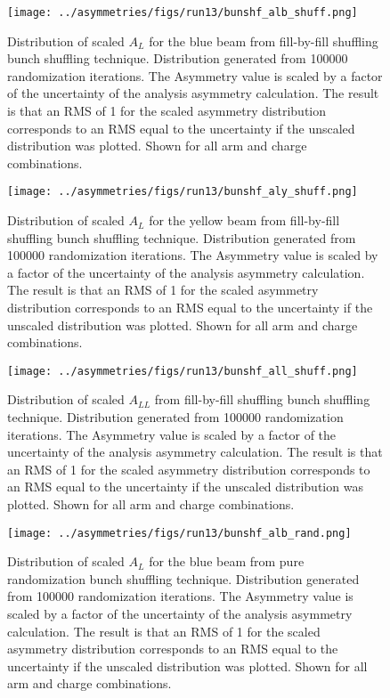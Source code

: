 \begin{figure}\label{fig:bnshf_shuf_alb}
\texttt{[image: ../asymmetries/figs/run13/bunshf\_alb\_shuff.png]}
\caption{Distribution of scaled $A_{L}$ for the blue beam from fill-by-fill shuffling bunch shuffling technique. Distribution generated from 100000
randomization iterations. The Asymmetry value is scaled by a factor of the uncertainty of the analysis asymmetry calculation. The result is that
an RMS of 1 for the scaled asymmetry distribution corresponds to an RMS equal to the uncertainty if the unscaled distribution was plotted. Shown
for all arm and charge combinations.}
\end{figure}

\begin{figure}\label{fig:bnshf_shuf_aly}
\texttt{[image: ../asymmetries/figs/run13/bunshf\_aly\_shuff.png]}
\caption{Distribution of scaled $A_{L}$ for the yellow beam from fill-by-fill shuffling bunch shuffling technique. Distribution generated from 100000
randomization iterations. The Asymmetry value is scaled by a factor of the uncertainty of the analysis asymmetry calculation. The result is that
an RMS of 1 for the scaled asymmetry distribution corresponds to an RMS equal to the uncertainty if the unscaled distribution was plotted. Shown
for all arm and charge combinations.}
\end{figure}

\begin{figure}\label{fig:bnshf_shuf_all}
\texttt{[image: ../asymmetries/figs/run13/bunshf\_all\_shuff.png]}
\caption{Distribution of scaled $A_{LL}$ from fill-by-fill shuffling bunch shuffling technique. Distribution generated from 100000
randomization iterations. The Asymmetry value is scaled by a factor of the uncertainty of the analysis asymmetry calculation. The result is that
an RMS of 1 for the scaled asymmetry distribution corresponds to an RMS equal to the uncertainty if the unscaled distribution was plotted. Shown
for all arm and charge combinations.}
\end{figure}

\begin{figure}\label{fig:bnshf_rand_alb}
\texttt{[image: ../asymmetries/figs/run13/bunshf\_alb\_rand.png]}
\caption{Distribution of scaled $A_{L}$ for the blue beam from pure randomization bunch shuffling technique. Distribution generated from 100000
randomization iterations. The Asymmetry value is scaled by a factor of the uncertainty of the analysis asymmetry calculation. The result is that
an RMS of 1 for the scaled asymmetry distribution corresponds to an RMS equal to the uncertainty if the unscaled distribution was plotted. Shown
for all arm and charge combinations.}
\end{figure}

